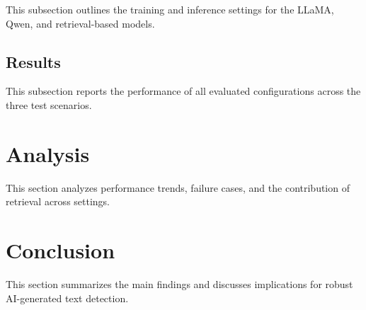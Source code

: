 \documentclass[letterpaper]{article} %
\begin{document}
This subsection outlines the training and inference settings for the LLaMA, Qwen, and retrieval-based models.

\subsection{Results}

This subsection reports the performance of all evaluated configurations across the three test scenarios.

\section{Analysis}

This section analyzes performance trends, failure cases, and the contribution of retrieval across settings.

\section{Conclusion}

This section summarizes the main findings and discusses implications for robust AI-generated text detection.


\end{document}
